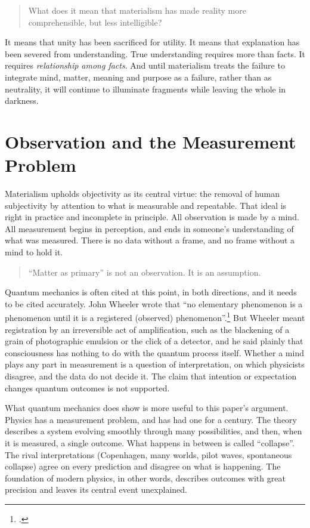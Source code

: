 \documentclass[11pt,a4paper]{article}
\newcommand{\fn}[1]{\footnote{\citealp{#1}.}}
\begin{document}
\begin{quote}
What does it mean that materialism has made reality more comprehensible, but less intelligible?
\end{quote}

It means that unity has been sacrificed for utility. It means that explanation has been severed from understanding. True understanding requires more than facts. It requires \textit{relationship among facts}. And until materialism treats the failure to integrate mind, matter, meaning and purpose as a failure, rather than as neutrality, it will continue to illuminate fragments while leaving the whole in darkness.

\section{Observation and the Measurement Problem}
\label{sec:measurement}

Materialism upholds objectivity as its central virtue: the removal of human subjectivity by attention to what is measurable and repeatable. That ideal is right in practice and incomplete in principle. All observation is made by a mind. All measurement begins in perception, and ends in someone's understanding of what was measured. There is no data without a frame, and no frame without a mind to hold it.

\begin{quote}
``Matter as primary'' is not an observation. It is an assumption.
\end{quote}

Quantum mechanics is often cited at this point, in both directions, and it needs to be cited accurately. John Wheeler wrote that ``no elementary phenomenon is a phenomenon until it is a registered (observed) phenomenon''.\fn{wheeler1983} But Wheeler meant registration by an irreversible act of amplification, such as the blackening of a grain of photographic emulsion or the click of a detector, and he said plainly that consciousness has nothing to do with the quantum process itself. Whether a mind plays any part in measurement is a question of interpretation, on which physicists disagree, and the data do not decide it. The claim that intention or expectation changes quantum outcomes is not supported.

What quantum mechanics does show is more useful to this paper's argument. Physics has a measurement problem, and has had one for a century. The theory describes a system evolving smoothly through many possibilities, and then, when it is measured, a single outcome. What happens in between is called ``collapse''.  The rival interpretations (Copenhagen, many worlds, pilot waves, spontaneous collapse) agree on every prediction and disagree on what is happening. The foundation of modern physics, in other words, describes outcomes with great precision and leaves its central event unexplained.
\end{document}
